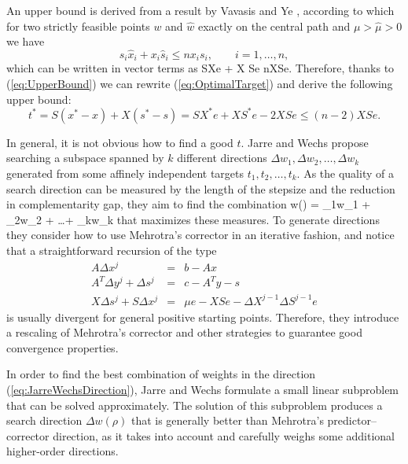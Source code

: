 
An upper bound is derived from a result by Vavasis and Ye 
\cite[Lemma~16]{VavasisYe}, according to which for two 
strictly feasible points $w$ and $\hat w$ exactly on the central path
and $\mu > \hat\mu > 0$ we have
\[
  s_i \hat x_i + x_i \hat s_i \le n x_i s_i, \qquad i = 1, \ldots, n,
\]
which can be written in vector terms as
\be  \label{eq:UpperBound}
  S\hat Xe + X \hat Se \le nXSe.
\ee
Therefore, thanks to (\ref{eq:UpperBound}) 
we can rewrite (\ref{eq:OptimalTarget}) and derive the following upper bound:
\[
  t^*= S(x^*-x) + X(s^*-s) = SX^*e + XS^*e -2XSe \le (n-2) XSe.
\]

In general, it is not obvious how to find a good $t$.
Jarre and Wechs \cite{JarreWechs} 
propose searching a subspace spanned by $k$ different 
directions $\Delta w_1, \Delta w_2, \ldots, \Delta w_k$ generated 
from some affinely independent targets $t_1,t_2,\ldots,t_k$.
As the quality of a search direction can be measured by the length 
of the stepsize and the reduction in complementarity gap, they aim 
to find the combination 
\be  \label{eq:JarreWechsDirection}
\Delta w(\rho) 
         = \rho_1\Delta w_1 + \rho_2\Delta w_2 + \ldots + \rho_k\Delta w_k
\ee
that maximizes these measures.
To generate directions they consider how to use Mehrotra's corrector 
in an iterative 
fashion, and notice that a straightforward recursion of the type
\begin{eqnarray*}
  A\Delta x^j &=& b-Ax \\
  A^T\Delta y^j +\Delta s^j &=& c-A^Ty-s \\
  X\Delta s^j + S\Delta x^j &=& \mu e  -XSe -\Delta X^{j-1}\Delta S^{j-1}e
\end{eqnarray*}
is usually divergent for general positive starting points.
Therefore, they introduce a rescaling of Mehrotra's corrector 
and other strategies to guarantee good convergence properties.

In order to find the best combination of weights in the direction 
(\ref{eq:JarreWechsDirection}), Jarre and Wechs \cite{JarreWechs} 
formulate a small linear subproblem that can 
be solved approximately. The solution of this subproblem 
produces a search direction $\Delta w(\rho)$ 
that is generally better than Mehrotra's predictor--corrector
direction, as it takes into account and carefully weighs some
additional higher-order directions.

